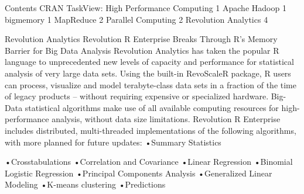 Contents
CRAN TaskView:  High Performance Computing	1
Apache Hadoop	1
bigmemory	1
MapReduce	2
Parallel Computing	2
Revolution Analytics	4



Revolution Analytics
Revolution R Enterprise Breaks Through R’s Memory Barrier for Big Data Analysis
Revolution Analytics has taken the popular R language to unprecedented new levels of capacity and performance for statistical analysis of very large data sets. Using the built-in RevoScaleR package, R users can process, visualize and model terabyte-class data sets in a fraction of the time of legacy products – without requiring expensive or specialized hardware.
Big-Data statistical algorithms make use of all available computing resources for high-performance analysis, without data size limitations. Revolution R Enterprise includes distributed, multi-threaded implementations of the following algorithms, with more planned for future updates: •Summary Statistics
 
•Crosstabulations
•Correlation and Covariance
•Linear Regression
•Binomial Logistic Regression
•Principal Components Analysis
•Generalized Linear Modeling
•K-means clustering 
•Predictions
